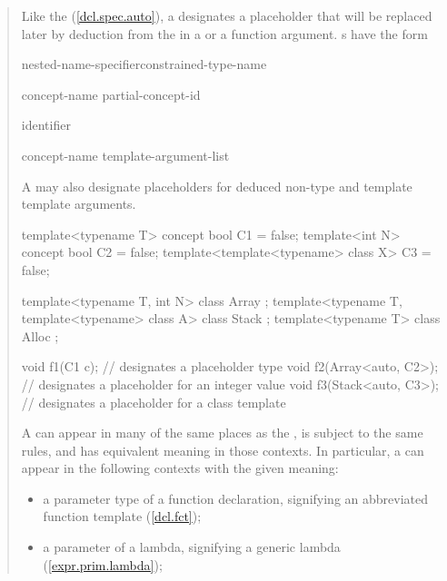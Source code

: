 \begin{quote}

\pnum
Like the   (\ref{dcl.spec.auto}),
a  designates a placeholder that 
will be replaced later by deduction from the  in a
 or a function argument.
% 
s have
the form

\begin{bnf}
\br
		nested-name-specifier\opt constrained-type-name

\br
  concept-name\br
  partial-concept-id

\br
  identifier

\br
		concept-name \terminal{<} template-argument-list\opt \terminal{>}
\end{bnf}

A 
may also designate placeholders for deduced non-type and template 
template arguments.
% 
\enterexample
\begin{codeblock}
template<typename T> concept bool C1 = false;
template<int N> concept bool C2 = false;
template<template<typename> class X> C3 = false;

template<typename T, int N> class Array { };
template<typename T, template<typename> class A> class Stack { };
template<typename T> class Alloc { };

void f1(C1 c);            //  designates a placeholder type
void f2(Array<auto, C2>); //  designates a placeholder for an integer value
void f3(Stack<auto, C3>); //  designates a placeholder for a class template
\end{codeblock}
\exitexample


A 
can appear in many of the same places as the 
, is subject
to the same rules, and has equivalent meaning in those contexts. 
In particular, a  
can appear in the following contexts with the given meaning:
% 
\begin{itemize}
\item a parameter type of a function declaration, signifying an 
     abbreviated function template (\ref{dcl.fct});

\item a parameter of a lambda, signifying a generic lambda 
     (\ref{expr.prim.lambda});


\end{itemize}
\end{quote}
